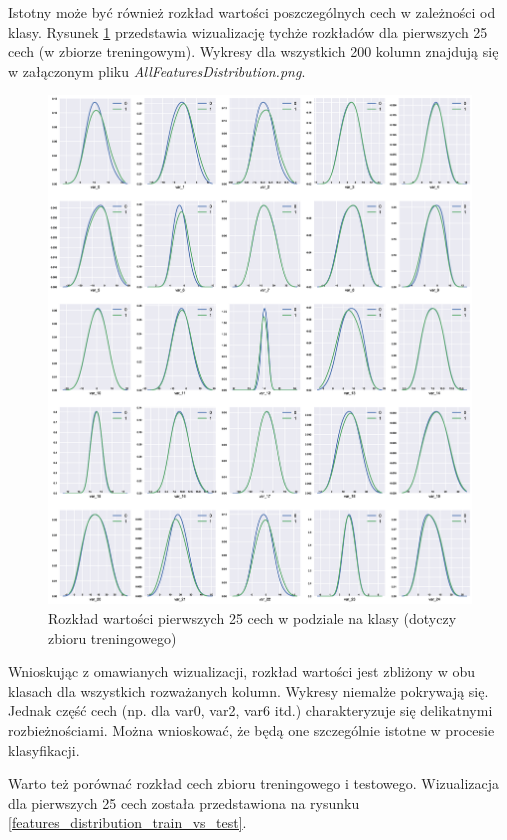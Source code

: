 ﻿\documentclass[12pt]{article}
\begin{document}
Istotny może być również rozkład wartości poszczególnych cech w zależności od klasy.
Rysunek \ref{featuresDistribution25} przedstawia wizualizację tychże rozkładów dla pierwszych 25 cech (w zbiorze treningowym). Wykresy dla wszystkich 200 kolumn znajdują się w załączonym pliku \textit{AllFeaturesDistribution.png}.

\begin{figure}[H]
\centering 
\includegraphics[width = 472pt]{feature_distribution.eps}
\caption{Rozkład wartości pierwszych 25 cech w podziale na klasy (dotyczy zbioru treningowego)}
\label{featuresDistribution25}
\end{figure}

Wnioskując z omawianych wizualizacji, rozkład wartości jest zbliżony w obu klasach dla wszystkich rozważanych kolumn. Wykresy niemalże pokrywają się. Jednak część cech (np. dla var0, var2, var6 itd.) charakteryzuje się delikatnymi rozbieżnościami. Można wnioskować, że będą one szczególnie istotne w procesie klasyfikacji.

Warto też porównać rozkład cech zbioru treningowego i testowego. Wizualizacja dla pierwszych 25 cech została przedstawiona na rysunku \ref{features_distribution_train_vs_test}.
\end{document}
